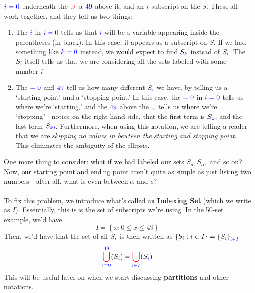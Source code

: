 \documentclass[10pt]{article}
\theoremstyle{definition}
\newcommand{\set}[1]{\left\{ #1 \right\}}
\begin{document}
$\color{blue}i=0$ underneath the $\color{red}\cup$, a $\color{blue}49$
above it, and an $\color{blue}i$ subscript on the $S$.  These all work
together, and they tell us two things:
\begin{enumerate}[label=\alph*)]
    \item The $\color{blue} i$ in $\color{blue}i=0$ tells us that
      $\color{blue}i$ will be a variable appearing inside the
      parentheses (in black).  In this case, it appears as a subscript
      on $S$.  If we had something like $\color{blue}k=0$ instead, we
      would expect to find $S_{\color{blue}k}$ instead of
      $S_{\color{blue}i}$.  The $S_{\color{blue} i}$ itself tells us
      that we are considering all the sets labeled with some number
      $i$
    \item The $\color{blue}=0$ and $\color{blue}49$ tell us how many
      different $S_{\color{blue}i}$ we have, by telling us a `starting
      point' and a `stopping point.'  In this case, the $\color{blue}
      =0$ in $\color{blue}i=0$ tells us where we're `starting,' and
      the $\color{blue}49$ above the $\textcolor{red}{\cup}$ tells us
      where we're `stopping'---notice on the right hand side, that the
      first term is $S_{\color{blue}0}$, and the last term
      $S_{\textcolor{blue}{49}}$.  Furthermore, when using this
      notation, we are telling a reader that we are \emph{skipping no
        values in bewteen the starting and stopping point}.  This
      eliminates the ambiguity of the ellipsis.
\end{enumerate}
One more thing to consider: what if we had labeled our sets $S_a,
S_{\alpha},$ and so on?  Now, our starting point and ending point
aren't quite as simple as just listing two numbers---after all, what
is even between $\alpha$ and $a$?\\~\\
To fix this problem, we introduce what's called an \textbf{Indexing
  Set} (which we write as $I$).  Essentially, this is is the set of
subscripts we're using.  In the 50-set example, we'd have
\[I = \set{x:0\leq x\leq49}\]
Then, we'd have that the set of all $S_{\color{blue}i}$ is then
written as $\set{S_{\color{blue}i}:{\color{blue}i}\in I} =
\set{S_{\color{blue}i}}_{\color{blue}i\in I}$
\[{\color{red}\bigcup^{{\color{blue}49}}_{\color{blue}i={0}}}(S_{\color{blue}i})
  = {\color{red}\bigcup_{\color{blue}i\in I}}(S_{\color{blue}i})\]
This will be useful later on when we start discussing
\textbf{partitions} and other notations.
\end{document}
